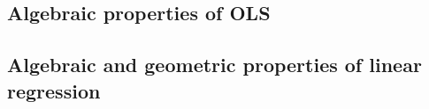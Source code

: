 

\subsection{Algebraic properties of OLS}

\subsection{Algebraic and geometric properties of linear regression}

